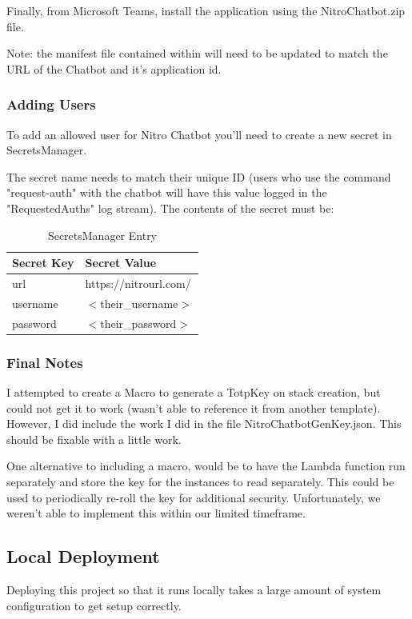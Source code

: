 \documentclass[onecolumn, draftclsnofoot,10pt, compsoc]{IEEEtran}
\begin{document}
Finally, from Microsoft Teams, install the application using the NitroChatbot.zip file.

Note: the manifest file contained within will need to be updated to match the URL of the Chatbot and it's application id.

\subsubsection{Adding Users}
To add an allowed user for Nitro Chatbot you'll need to create a new secret in SecretsManager.

The secret name needs to match their unique ID (users who use the command "request-auth" with the chatbot will have this value logged in the "RequestedAuths" log stream). The contents of the secret must be:
\begin{table}
    \caption{SecretsManager Entry}
    \centering
\begin{tabular}{| p{2.5cm} | p{5.0cm} |}
    \hline \textbf{Secret Key} & \textbf{Secret Value} \\
    \hline
    url & https://nitrourl.com/
    \\ \hline
    username & $<$their\_username$>$
    \\ \hline
    password & $<$their\_password$>$
    \\ \hline
\end{tabular}
\end{table}

\subsubsection{Final Notes}
I attempted to create a Macro to generate a TotpKey on stack creation, but could not get it to work (wasn't able to reference it from another template).
However, I did include the work I did in the file NitroChatbotGenKey.json.
This should be fixable with a little work.

One alternative to including a macro, would be to have the Lambda function run separately and store the key for the instances to read separately. This could be used to periodically re-roll the key for additional security. Unfortunately, we weren't able to implement this within our limited timeframe.

\subsection{Local Deployment}
Deploying this project so that it runs locally takes a large amount of system configuration to get setup correctly.
\end{document}
